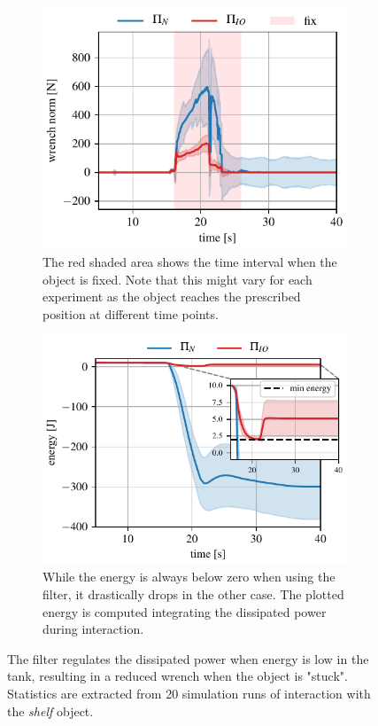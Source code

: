 \begin{figure}[t]
\centering
\hspace*{-0.0cm} 
\begin{subfigure}{0.8\columnwidth}
    \includegraphics[width=\linewidth]{figures/fix_experiment/wrench_with_without_tank.pdf}
    \caption{The red shaded area shows the time interval when the object is fixed. Note that this might vary for each experiment as the object reaches the prescribed position at different time points.}
\end{subfigure}
\hspace*{-0.0cm} 
\begin{subfigure}{0.8\columnwidth}
    \includegraphics[width=\linewidth]{figures/fix_experiment/energy_with_without_tank.pdf}
    \caption{While the energy is always below zero when using the filter, it drastically drops in the other case. The plotted energy is computed integrating the dissipated power during interaction.}
\end{subfigure}
\hfill
\caption{The filter regulates the dissipated power when energy is low in the tank, resulting in a reduced wrench when the object is "stuck". Statistics are extracted from 20 simulation runs of interaction with the \textit{shelf} object.}\label{fig:tank_comparison}
\end{figure}

